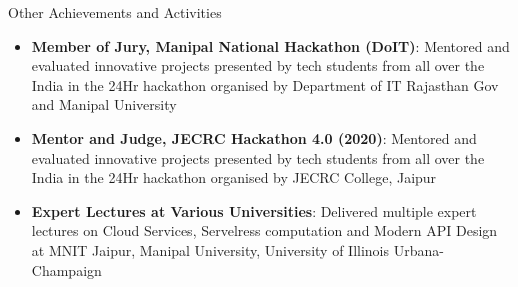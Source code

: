 \documentclass{resume} %
\begin{document}
	\begin{rSection}{Other Achievements and Activities}
		\begin{itemize}
			\item \textbf{Member of Jury, Manipal National Hackathon (DoIT)}: Mentored and evaluated innovative projects presented by tech students from all over the India in the 24Hr hackathon organised by Department of IT Rajasthan Gov and Manipal University
			\item \textbf{Mentor and Judge, JECRC Hackathon 4.0 (2020)}: Mentored and evaluated innovative projects presented by tech students from all over the India in the 24Hr hackathon organised by JECRC College, Jaipur
			\item \textbf{Expert Lectures at Various Universities}: Delivered multiple expert lectures on Cloud Services, Servelress computation and Modern API Design at MNIT Jaipur, Manipal University, University of Illinois Urbana-Champaign
		\end{itemize}
	\end{rSection}
		

	
\end{document}
